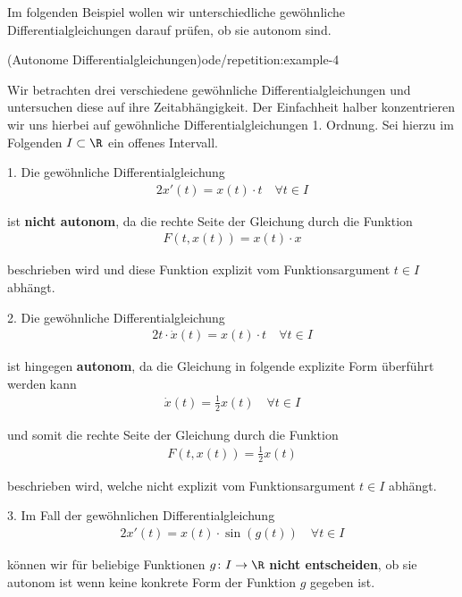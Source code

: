 \documentclass[letterpaper,10pt,german]{jupyterBook}
\begin{document}
\par
Im folgenden Beispiel wollen wir unterschiedliche gewöhnliche Differentialgleichungen darauf prüfen, ob sie autonom sind.
\begin{example}{(Autonome Differentialgleichungen)}{ode/repetition:example-4}



\par
Wir betrachten drei verschiedene gewöhnliche Differentialgleichungen und untersuchen diese auf ihre Zeitabhängigkeit.
Der Einfachheit halber konzentrieren wir uns hierbei auf gewöhnliche Differentialgleichungen 1. Ordnung.
Sei hierzu  im Folgenden \(I \subset \R\) ein offenes Intervall.

\par
1. Die gewöhnliche Differentialgleichung
\begin{align*}
2x'(t) = x(t)\cdot t \quad \forall t \in I
\end{align*}
\par
ist \textbf{nicht autonom}, da die rechte Seite der Gleichung durch die Funktion
\begin{align*}
F(t,x(t)) = x(t) \cdot x
\end{align*}
\par
beschrieben wird und diese Funktion explizit vom Funktionsargument \(t \in I\) abhängt.



\par
2. Die gewöhnliche Differentialgleichung
\begin{align*}
2t\cdot \dot{x}(t) = x(t)\cdot t \quad \forall t \in I
\end{align*}
\par
ist hingegen \textbf{autonom}, da die Gleichung in folgende explizite Form überführt werden kann
\begin{align*}
\dot{x}(t) = \frac{1}{2} x(t) \quad \forall t \in I
\end{align*}
\par
und somit die rechte Seite der Gleichung durch die Funktion
\begin{align*}
F(t,x(t)) = \frac{1}{2}x(t)
\end{align*}
\par
beschrieben wird, welche nicht explizit vom Funktionsargument \(t \in I\) abhängt.



\par
3. Im Fall der gewöhnlichen Differentialgleichung
\begin{align*}
2x'(t) = x(t)\cdot \sin(g(t)) \quad \forall t \in I
\end{align*}
\par
können wir für beliebige Funktionen \(g \colon I \rightarrow \R\) \textbf{nicht entscheiden}, ob sie autonom ist wenn keine konkrete Form der Funktion \(g\) gegeben ist.
\end{example}
\end{document}
